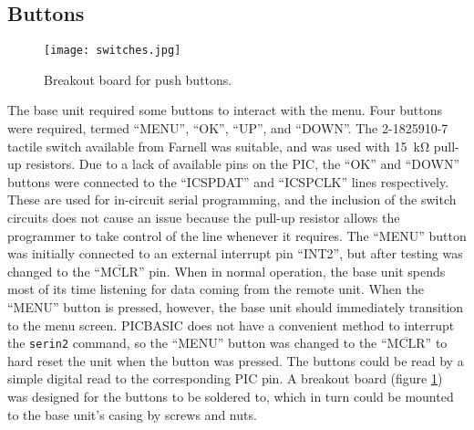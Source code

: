 \subsection{Buttons}
\begin{figure}[htbp]
	\centering
	\texttt{[image: switches.jpg]}
	\caption{Breakout board for push buttons.}
	\label{fig: buttons}
\end{figure}

The base unit required some buttons to interact with the menu. Four buttons were required, termed ``MENU'', ``OK'', ``UP'', and ``DOWN''. The 2-1825910-7 tactile switch \cite{buttons} available from Farnell was suitable, and was used with \SI{15}{\kilo\ohm} pull-up resistors. Due to a lack of available pins on the PIC, the ``OK'' and ``DOWN'' buttons were connected to the ``ICSPDAT'' and ``ICSPCLK'' lines respectively. These are used for in-circuit serial programming, and the inclusion of the switch circuits does not cause an issue because the pull-up resistor allows the programmer to take control of the line whenever it requires. The ``MENU'' button was initially connected to an external interrupt pin ``INT2'', but after testing was changed to the ``$\overline{\text{MCLR}}$'' pin. When in normal operation, the base unit spends most of its time listening for data coming from the remote unit. When the ``MENU'' button is pressed, however, the base unit should immediately transition to the menu screen. PICBASIC does not have a convenient method to interrupt the \verb|serin2| command, so the ``MENU'' button was changed to the ``$\overline{\text{MCLR}}$'' to hard reset the unit when the button was pressed. The buttons could be read by a simple digital read to the corresponding PIC pin. A breakout board (figure \ref{fig: buttons}) was designed for the buttons to be soldered to, which in turn could be mounted to the base unit's casing by screws and nuts.\\









